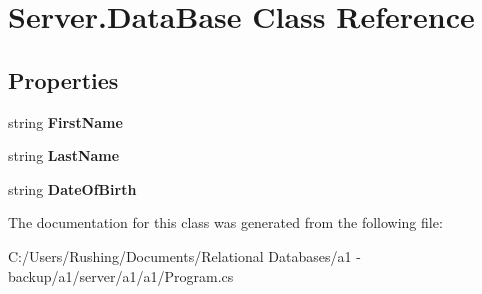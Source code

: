 \hypertarget{class_server_1_1_data_base}{}\section{Server.\+Data\+Base Class Reference}
\label{class_server_1_1_data_base}
\subsection*{Properties}
\begin{DoxyCompactItemize}
\item 
\mbox{\label{class_server_1_1_data_base_a46ba62c132d4be41b2657d58f3961b3a}} 
string {\bfseries First\+Name}
\item 
\mbox{\label{class_server_1_1_data_base_a52053532126327b7c726bf2a14a9290e}} 
string {\bfseries Last\+Name}
\item 
\mbox{\label{class_server_1_1_data_base_a53483e9e2a7eaac5a66c7aef7a2c30aa}} 
string {\bfseries Date\+Of\+Birth}
\end{DoxyCompactItemize}


The documentation for this class was generated from the following file\+:\begin{DoxyCompactItemize}
\item 
C\+:/\+Users/\+Rushing/\+Documents/\+Relational Databases/a1 -\/ backup/a1/server/a1/a1/Program.\+cs\end{DoxyCompactItemize}
